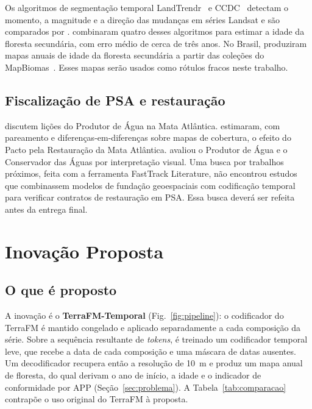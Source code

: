 \documentclass[conference]{IEEEtran}
\begin{document}
Os algoritmos de segmentação temporal LandTrendr~\citep{kennedy2010} e CCDC~\citep{zhu2014} detectam o momento, a magnitude e a direção das mudanças em séries Landsat e são comparados por \citet{pasquarella2022}. \citet{zhang2023} combinaram quatro desses algoritmos para estimar a idade da floresta secundária, com erro médio de cerca de três anos. No Brasil, \citet{silva2020} produziram mapas anuais de idade da floresta secundária a partir das coleções do MapBiomas~\citep{souza2020}. Esses mapas serão usados como rótulos fracos neste trabalho.

\subsection{Fiscalização de PSA e restauração}

\citet{viani2019} discutem lições do Produtor de Água na Mata Atlântica. \citet{toto2025} estimaram, com pareamento e diferenças-em-diferenças sobre mapas de cobertura, o efeito do Pacto pela Restauração da Mata Atlântica. \citet{ruggiero2019} avaliou o Produtor de Água e o Conservador das Águas por interpretação visual. Uma busca por trabalhos próximos, feita com a ferramenta FastTrack Literature, não encontrou estudos que combinassem modelos de fundação geoespaciais com codificação temporal para verificar contratos de restauração em PSA. Essa busca deverá ser refeita antes da entrega final.

\section{Inovação Proposta}\label{sec:inovacao}

\subsection{O que é proposto}

A inovação é o \textbf{TerraFM-Temporal} (Fig.~\ref{fig:pipeline}): o codificador do TerraFM é mantido congelado e aplicado separadamente a cada composição da série. Sobre a sequência resultante de \textit{tokens}, é treinado um codificador temporal leve, que recebe a data de cada composição e uma máscara de datas ausentes. Um decodificador recupera então a resolução de 10~m e produz um mapa anual de floresta, do qual derivam o ano de início, a idade e o indicador de conformidade por APP (Seção~\ref{sec:problema}). A Tabela~\ref{tab:comparacao} contrapõe o uso original do TerraFM à proposta.
\end{document}
